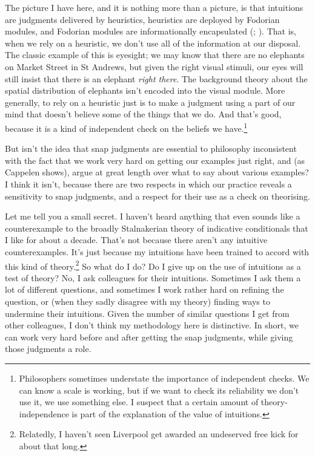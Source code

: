 \documentclass[
  11pt,
  letterpaper,
  DIV=11,
  numbers=noendperiod,
  twoside]{scrartcl}
\begin{document}
The picture I have here, and it is nothing more than a picture, is that
intuitions are judgments delivered by heuristics, heuristics are
deployed by Fodorian modules, and Fodorian modules are informationally
encapsulated (;
). That is, when we rely on a
heuristic, we don't use all of the information at our disposal. The
classic example of this is eyesight; we may know that there are no
elephants on Market Street in St Andrews, but given the right visual
stimuli, our eyes will still insist that there is an elephant
\emph{right there}. The background theory about the spatial distribution
of elephants isn't encoded into the visual module. More generally, to
rely on a heuristic just is to make a judgment using a part of our mind
that doesn't believe some of the things that we do. And that's good,
because it is a kind of independent check on the beliefs we
have.\footnote{Philosophers sometimes understate the importance of
  independent checks. We can know a scale is working, but if we want to
  check its reliability we don't use it, we use something else. I
  suspect that a certain amount of theory-independence is part of the
  explanation of the value of intuitions.}

But isn't the idea that snap judgments are essential to philosophy
inconsistent with the fact that we work very hard on getting our
examples just right, and (as Cappelen shows), argue at great length over
what to say about various examples? I think it isn't, because there are
two respects in which our practice reveals a sensitivity to snap
judgments, and a respect for their use as a check on theorising.

Let me tell you a small secret. I haven't heard anything that even
sounds like a counterexample to the broadly Stalnakerian theory of
indicative conditionals that I like for about a decade. That's not
because there aren't any intuitive counterexamples. It's just because my
intuitions have been trained to accord with this kind of
theory.\footnote{Relatedly, I haven't seen Liverpool get awarded an
  undeserved free kick for about that long.} So what do I do? Do I give
up on the use of intuitions as a test of theory? No, I ask colleagues
for their intuitions. Sometimes I ask them a lot of different questions,
and sometimes I work rather hard on refining the question, or (when they
sadly disagree with my theory) finding ways to undermine their
intuitions. Given the number of similar questions I get from other
colleagues, I don't think my methodology here is distinctive. In short,
we can work very hard before and after getting the snap judgments, while
giving those judgments a role.
\end{document}
